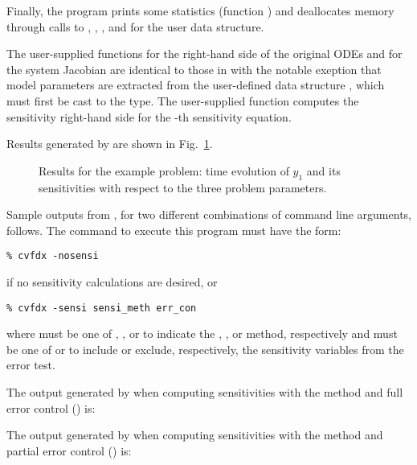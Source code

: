 Finally, the program prints some statistics (function ) 
and deallocates memory through calls
to , , 
, and  for the user data structure.

The user-supplied functions  for the right-hand side of the original ODEs and
 for the system Jacobian are identical to those in  with the 
notable exeption that model parameters are extracted from the user-defined data structure
, which must first be cast to the  type. The user-supplied
function  computes the sensitivity right-hand side for the -th 
sensitivity equation.

Results generated by  are shown in Fig.~\ref{f:cvfdx}. 
\begin{figure}
  {\centerline{}}
  \caption{Results for the  example problem:
    time evolution of $y_1$ and its sensitivities with respect to the
    three problem parameters.}
  \label{f:cvfdx}
\end{figure}
Sample outputs from , for two different combinations of command line arguments, 
follows. The command to execute this program must have the form:
\begin{verbatim}
% cvfdx -nosensi
\end{verbatim} 
if no sensitivity calculations are desired, or
\begin{verbatim}
% cvfdx -sensi sensi_meth err_con
\end{verbatim}
where  must be one of , , or  to
indicate the , , or  method,
respectively and  must be one of  or  to
include or exclude, respectively, the sensitivity variables from the error test.

The output generated by  when computing sensitivities with the 
method and full error control () is:


The output generated by  when computing sensitivities with the 
method and partial error control () is:


